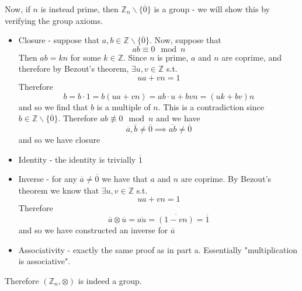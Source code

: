 \documentclass{article}
\newcommand{\chapternumber}{2}
\newenvironment{QandA}{\begin{enumerate}[label=\chapternumber.\arabic*]\bfseries\boldmath}
	{\end{enumerate}}
\newenvironment{answered}{\par\bigskip\normalfont\unboldmath}{}
\begin{document}
\begin{QandA}
\begin{answered}
			Now, if $n$ is instead prime, then $\mathbb{Z}_n\backslash\{\overline{0}\}$ is a group - we will show this by verifying the group axioms.
			\begin{itemize}
				\item Closure - suppose that $a,b\in\mathbb{Z}\backslash\{\overline{0}\}$. Now, suppose that
				\[ab\equiv 0 \mod{n}\]
				Then $ab=kn$ for some $k\in \mathbb{Z}$. Since $n$ is prime, $a$ and $n$ are coprime, and therefore by Bezout's theorem, $\exists u,v\in\mathbb{Z}$ s.t.
				\[ua+vn=1\]
				Therefore
				\[b = b\cdot 1 = b(ua+vn) = ab\cdot u + bvn = (uk+bv)n\]
				and so we find that $b$ is a multiple of $n$. This is a contradiction since $b\in\mathbb{Z}\backslash\{\overline{0}\}$. Therefore $ab\not\equiv 0 \mod{n}$ and we have 
				\[\overline{a},\overline{b}\neq\overline{0}\implies\overline{ab}\neq\overline{0}\]
				and so we have closure
				\item Identity - the identity is trivially $\overline{1}$
				\item Inverse - for any $\overline{a}\neq\overline{0}$ we have that $a$ and $n$ are coprime. By Bezout's theorem we know that $\exists u,v\in\mathbb{Z}$ s.t.
				\[ua+vn=1\]
				Therefore
				\[\overline{a}\otimes\overline{u}=\overline{au}=\overline{(1-vn)}=\overline{1}\]
				and so we have constructed an inverse for $\overline{a}$
				\item Associativity - exactly the same proof as in part a. Essentially "multiplication is associative".
			\end{itemize}
			Therefore $(\mathbb{Z}_n,\otimes)$ is indeed a group.
		\end{answered}
		

\end{QandA}
\end{document}
